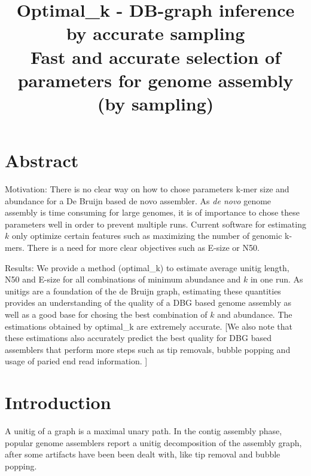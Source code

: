 \documentclass[a4paper,11pt]{article}
\newcommand{\kristoffer}[1]{{\color{red}{#1}}}
\begin{document}
\title{Optimal\_k - DB-graph inference by accurate sampling \\Fast and accurate selection of parameters for genome assembly (by sampling)} 
\author{}
\date{} %
\maketitle

\section{Abstract}
Motivation: There is no clear way on how to chose parameters k-mer size and abundance for a De Bruijn based de novo assembler. As \emph{de novo} genome assembly is time consuming for large genomes, it is of importance to chose these parameters well in order to prevent multiple runs. Current software for estimating $k$ only optimize certain features such as maximizing the number of genomic k-mers. There is a need for more clear objectives such as E-size or N50.

Results:
We provide a method (optimal\_k) to estimate average unitig length, N50 and E-size for all combinations of minimum abundance and $k$ in one run. As unitigs are a foundation of the de Bruijn graph, estimating these quantities provides an understanding of the quality of a DBG based genome assembly as well as a good base for chosing the best combination of $k$ and abundance. The estimations obtained by optimal\_k are extremely accurate. [We also note that these estimations also accurately predict the best quality for DBG based assemblers that perform more steps such as tip removals, bubble popping and usage of paried end read information. ]

\section{Introduction} %
\label{sec:introduction}

\kristoffer{ Mention that there are not many tools for computing optimal parameters at all. And make sure to mention that memry is not the issue. Mention the positives about our methods like speed and clear objective function but make sure to mention that it's memory requiring but thats not a problem if you are going to do the assembly anyway!!}

A unitig of a graph is a maximal unary path. In the contig assembly phase, popular genome assemblers report a unitig decomposition of the assembly graph, after some artifacts have been been dealt with, like tip removal and bubble popping.
\end{document}
